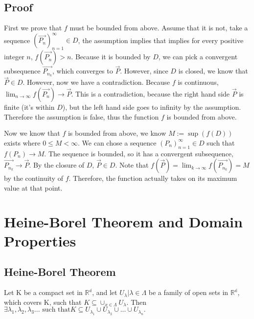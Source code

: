 \documentclass[11 pt, twoside]{article}
\begin{document}
\subsection{Proof}
First we prove that $f$ must be bounded from above. Assume that it is not, take
a sequence $(\vec{P_n})_{n=1}^\infty \in D$, the assumption implies that
implies for every positive integer $n$, $f(\vec{P_n}) > n$. Because it is bounded by
$D$, we can pick a convergent subsequence $\vec{P_{n_k}}$, which converges to
$\vec{P}$. However, since $D$ is closed, we know that $\vec{P} \in D$. However, now we have a contradiction. Because
$f$ is continuous, $\lim_{n\to\infty}f(\vec{P_n}) \to \vec{P}$. This is a contradiction,
because the right hand side $\vec{P}$ is finite (it's within $D$), but the left hand
side goes to infinity by the assumption. Therefore the assumption is false,
thus the function $f$ is bounded from above.

Now we know that $f$ is bounded from above, we know $M := \sup{(f(D))}$ exists
where $0\leq M < \infty$. We can chose a sequence $(P_n)_{n = 1}^\infty \in D$
such that $f(P_n) \to M$. The sequence is bounded, so it has a convergent
subsequence, $\vec{P_{n_k}} \to \vec{P}$. By the closure of $D$, $\vec{P} \in
D$. Note that $f(\vec{P}) = \lim_{k\to\infty} f(\vec{P_{n_k}}) = M$ by the
continuity of $f$. Therefore, the function actually takes on its maximum value
at that point.

\section{Heine-Borel Theorem and Domain Properties}

\subsection{Heine-Borel Theorem}
Let K be a compact set in $\mathbb{R^d}$, and let ${U_\lambda | \lambda \in \Lambda}$ be a family of open sets in $\mathbb{R^d}$, which covers K, such that $K \subseteq \cup_{x \in \Lambda}U_\lambda$. Then $\exists \lambda_1, \lambda_2, \lambda_3 \text{... such that} K \subseteq U_{\lambda_1} \cup U_{\lambda_2} \cup \text{...} \cup U_{\lambda_n}.$
\end{document}
